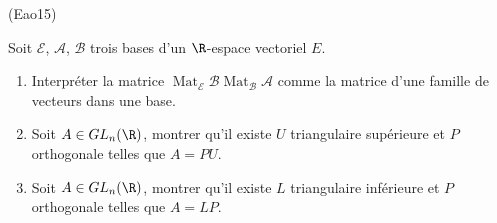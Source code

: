 \begin{tiny}(Eao15)\end{tiny} Soit $\mathcal{E}$, $\mathcal{A}$, $\mathcal{B}$ trois bases d'un $\R$-espace vectoriel $E$.
\begin{enumerate}
 \item Interpréter la matrice $\mathop{\mathrm{Mat}}_{\mathcal E}\mathcal{B}\mathop{\mathrm{Mat}}_{\mathcal B}\mathcal{A}$ comme la matrice d'une famille de vecteurs dans une base.
 \item Soit $A\in GL_n(\R)$, montrer qu'il existe $U$ triangulaire supérieure et $P$ orthogonale telles que $A=PU$.
 \item Soit $A\in GL_n(\R)$, montrer qu'il existe $L$ triangulaire inférieure et $P$ orthogonale telles que $A=LP$.
\end{enumerate}
